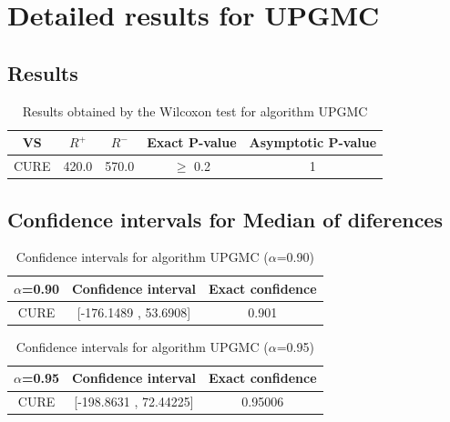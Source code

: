 \documentclass[a4paper,10pt]{article}
\begin{document}
 \clearpage 


\section{Detailed results for UPGMC}


\subsection{Results}

\begin{table}[!htp]
\centering\small
\begin{tabular}{
|c|c|c|c|c|}
\hline
 VS & $R^{+}$ & $R^{-}$ & Exact P-value & Asymptotic P-value \\ \hline 
CURE & 420.0 & 570.0 & $\geq$ 0.2 & 1\\ \hline 

\end{tabular}
\caption{Results obtained by the Wilcoxon test for algorithm UPGMC}
\end{table}

\subsection{Confidence intervals for Median of diferences}

\begin{table}[!htp]
\centering\small
\begin{tabular}{
|c|c|c|}
\hline
 $\alpha$=0.90 & Confidence interval & Exact confidence \\ \hline 
CURE & [-176.1489 , 53.6908] & 0.901\\ \hline 

\end{tabular}
\caption{Confidence intervals for algorithm UPGMC ($\alpha$=0.90)}
\end{table}
\begin{table}[!htp]
\centering\small
\begin{tabular}{
|c|c|c|}
\hline
 $\alpha$=0.95 & Confidence interval & Exact confidence \\ \hline 
CURE & [-198.8631 , 72.44225] & 0.95006\\ \hline 

\end{tabular}
\caption{Confidence intervals for algorithm UPGMC ($\alpha$=0.95)}
\end{table}

 \clearpage 
\end{document}
